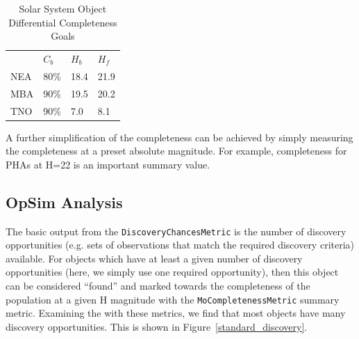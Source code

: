 \begin{table}[]
\centering
\caption{Solar System Object Differential Completeness Goals}
\label{ssoreqs}
\begin{tabular}{llll}
    & $C_b$ & $H_b$ & $H_f$ \\
NEA & 80\%  & 18.4  & 21.9  \\
MBA & 90\%  & 19.5  & 20.2  \\
TNO & 90\%  & 7.0   & 8.1
\end{tabular}
\end{table}

A further simplification of the completeness can be achieved by simply
measuring the completeness at a preset absolute magnitude. For
example, completeness for PHAs at H=22 is an important summary value.



\subsection{OpSim Analysis}
\label{sec:\secname:analysis}

The basic output from the {\tt DiscoveryChancesMetric} is the number
of discovery opportunities (e.g. sets of observations that match the
required discovery criteria) available. For objects which have at
least a given number of discovery opportunities (here, we simply use
one required opportunity), then this object can be considered
``found'' and marked towards the completeness of the population at a
given H magnitude with the {\tt MoCompletenessMetric} summary metric.
Examining the  with these metrics, we find
that most objects have many discovery opportunities. This is shown in
Figure~\ref{standard_discovery}. 


